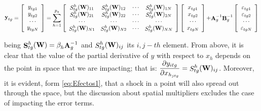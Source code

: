 \documentclass[article]{jss}
\begin{document}
\begin{equation}
{\mathop{{\bf y}}\nolimits_{tg} }=\mathop{\left[\begin{array}{c} {\mathop{y}\nolimits_{tg1} } \\ {\mathop{y}\nolimits_{tg2} } \\ {\cdots } \\ {\mathop{y}\nolimits_{tgN} } \end{array}\right]} = \sum_{h=1}^{p_{q}} \mathop{\left[\begin{array}{cccc} {\mathop{S}\nolimits^{h}_{tg}({\bf W})_{11}} & {\mathop{S}\nolimits^{h}_{tg}({\bf W})_{12}} & {\cdots } & {\mathop{S}\nolimits^{h}_{tg}({\bf W})_{1N}} \\ {\mathop{S}\nolimits^{h}_{tg}({\bf W})_{21}} & {\mathop{S}\nolimits^{h}_{tg}({\bf W})_{22}} & {\cdots } & {\mathop{S}\nolimits^{h}_{tg}({\bf W})_{2N}} \\ {\cdots } & {\cdots } & {\cdots } & {\cdots } \\ {\mathop{S}\nolimits^{h}_{tg}({\bf W})_{N1}} & {\mathop{S}\nolimits^{h}_{tg}({\bf W})_{N2}} & {\cdots } & {\mathop{S}\nolimits^{h}_{tg}({\bf W})_{NN}} \end{array}\right]} \mathop{\left[\begin{array}{c} {\mathop{x}\nolimits_{tg1} } \\ {\mathop{x}\nolimits_{tg2} } \\ {\cdots } \\ {\mathop{x}\nolimits_{tgN} } \end{array}\right]}+ {\mathop{{\bf A}}\nolimits_{g}^{-1}} {\mathop{{\bf B}}\nolimits_{g}^{-1}} \mathop{\left[\begin{array}{c} {\mathop{\varepsilon}\nolimits_{tg1} } \\ {\mathop{\varepsilon}\nolimits_{tg2} } \\ {\cdots } \\ {\mathop{\varepsilon}\nolimits_{tgN} } \end{array}\right]}
 \label{eq:Efectos1}
\end{equation}

being \({\mathop{{\bf S}}\nolimits^{h}_{tg}({\bf W})}= {\mathop{\beta}\nolimits_{h}} {\mathop{{\bf A}}\nolimits_{g}^{-1}}\) and \({\mathop{S}\nolimits^{h}_{tg}({\bf W})_{ij}}\) its \(i,j-th\) element. From above, it is clear that the value of the partial derivative of \(y\) with respect to \(x_{h}\) depends on the point in space that we are impacting; that is: \(\dfrac{\partial y_{itg}}{\partial x_{h_{jtg}}} = {\mathop{S}\nolimits^{h}_{tg}({\bf W})_{ij}}\). Moreover, it is evident, form \eqref{eq:Efectos1}, that a shock in a point will also spread out through the space, but the discussion about spatial multipliers excludes the case of impacting the error terms.
\end{document}
